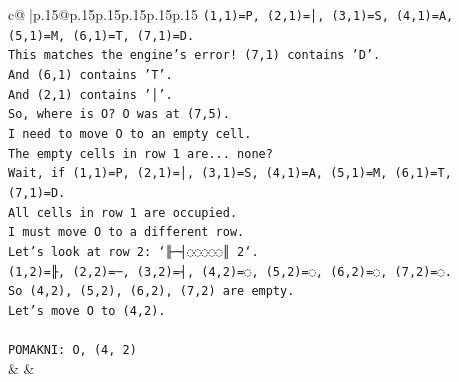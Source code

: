 \documentclass{article}
\begin{document}
{\begin{supertabular}{c@{$\;$}|p{.15\linewidth}@{}p{.15\linewidth}p{.15\linewidth}p{.15\linewidth}p{.15\linewidth}p{.15\linewidth}}
{{{\texttt{(1,1)=P, (2,1)=│, (3,1)=S, (4,1)=A, (5,1)=M, (6,1)=T, (7,1)=D.} \\
\texttt{This matches the engine's error! (7,1) contains 'D'.} \\
\texttt{And (6,1) contains 'T'.} \\
\texttt{And (2,1) contains '│'.} \\
\texttt{So, where is O? O was at (7,5).} \\
\texttt{I need to move O to an empty cell.} \\
\texttt{The empty cells in row 1 are... none?} \\
\texttt{Wait, if (1,1)=P, (2,1)=│, (3,1)=S, (4,1)=A, (5,1)=M, (6,1)=T, (7,1)=D.} \\
\texttt{All cells in row 1 are occupied.} \\
\texttt{I must move O to a different row.} \\
\texttt{Let's look at row 2: `╟─┤◌◌◌◌◌║ 2`.} \\
\texttt{(1,2)=╟, (2,2)=─, (3,2)=┤, (4,2)=◌, (5,2)=◌, (6,2)=◌, (7,2)=◌.} \\
\texttt{So (4,2), (5,2), (6,2), (7,2) are empty.} \\
\texttt{Let's move O to (4,2).} \\
\\ 
\texttt{POMAKNI: O, (4, 2)} \\
            }
        }
    }
    & & \\ \\


\end{supertabular}}
\end{document}
